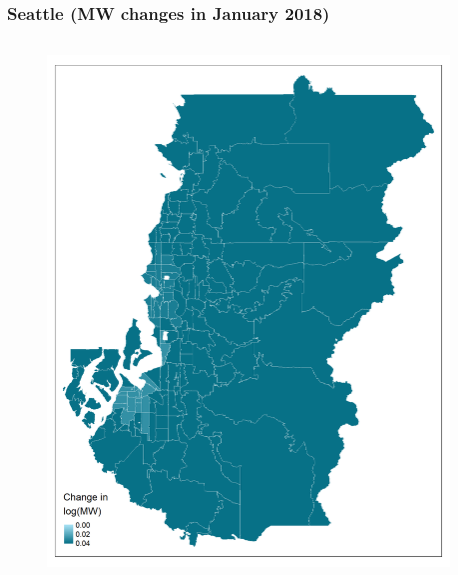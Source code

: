 \documentclass[aspectratio=169, t]{beamer}
\begin{document}
\begin{frame}[label = bay_example]
\begin{columns}
\begin{column}{0.50\textwidth}
\begin{figure}
            \end{figure}   
        \end{column}
    \end{columns}
    \hyperlink{chi_example}{}
\end{frame}

\begin{frame}[label = seattle_example]
\frametitle{Seattle (MW changes in January 2018)}
    \begin{columns}
        \begin{column}{0.50\textwidth}
            \vspace{-4mm}
            \begin{figure}
                \centering
                \includegraphics[scale = 0.36]{maps_events/output/seattle_2018-12_actual_mw.png}
            \end{figure}   
        \end{column}
        \begin{column}{0.50\textwidth}
            \vspace{-4mm}

\end{column}
\end{columns}
\end{frame}
\end{document}
